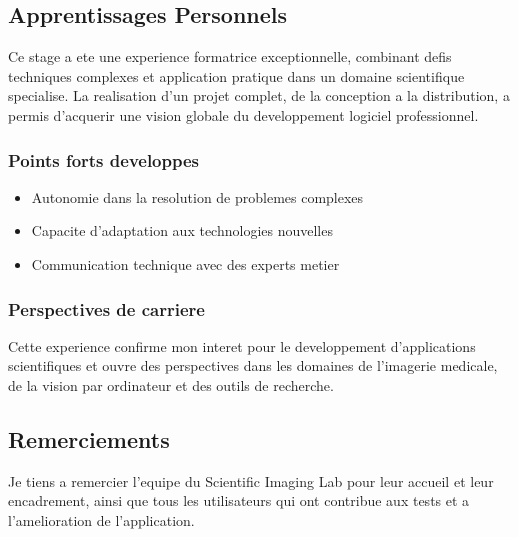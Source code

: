 \documentclass[12pt,a4paper]{article}
\begin{document}
\subsection{Apprentissages Personnels}

Ce stage a ete une experience formatrice exceptionnelle, combinant defis techniques complexes et application pratique dans un domaine scientifique specialise. La realisation d'un projet complet, de la conception a la distribution, a permis d'acquerir une vision globale du developpement logiciel professionnel.

\subsubsection{Points forts developpes}
\begin{itemize}
\item Autonomie dans la resolution de problemes complexes
\item Capacite d'adaptation aux technologies nouvelles
\item Communication technique avec des experts metier
\end{itemize}

\subsubsection{Perspectives de carriere}
Cette experience confirme mon interet pour le developpement d'applications scientifiques et ouvre des perspectives dans les domaines de l'imagerie medicale, de la vision par ordinateur et des outils de recherche.

\subsection{Remerciements}

Je tiens a remercier l'equipe du Scientific Imaging Lab pour leur accueil et leur encadrement, ainsi que tous les utilisateurs qui ont contribue aux tests et a l'amelioration de l'application.
\end{document}
